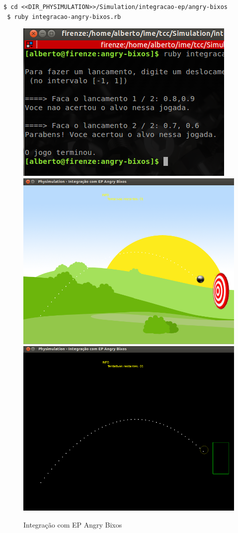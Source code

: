 \begin{Verbatim}[fontsize=\footnotesize]
 $ cd <<DIR_PHYSIMULATION>>/Simulation/integracao-ep/angry-bixos
 $ ruby integracao-angry-bixos.rb 
\end{Verbatim}

\begin{figure}[H]
  \centering
	\includegraphics[scale=0.6]{images/angry-bixos-3.png}
	\includegraphics[scale=0.22]{images/angry-bixos-4.png}
	\includegraphics[scale=0.22]{images/angry-bixos-4E.png}
	\caption{Integração com EP Angry Bixos}
  \label{int-angry}
\end{figure}

